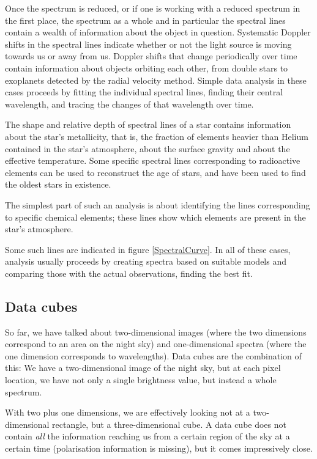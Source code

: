 \documentclass[twocolumn,apj]{openjournal}
\begin{document}
Once the spectrum is reduced, or if one is working with a reduced spectrum in the first place, the spectrum as a whole and in particular the spectral lines contain a wealth of information about the object in question. Systematic Doppler shifts in the spectral lines indicate whether or not the light source is moving towards us or away from us. Doppler shifts that change periodically over time contain information about objects orbiting each other, from double stars to exoplanets detected by the radial velocity method. Simple data analysis in these cases proceeds by fitting the individual spectral  lines, finding their central wavelength, and tracing the changes of that wavelength over time. 

The shape and relative depth of spectral lines of a star contains information about the star's metallicity, that is, the fraction of elements heavier than Helium contained in the star's atmosphere, about the surface gravity and about the effective temperature. Some specific spectral lines corresponding to radioactive elements can be used to reconstruct the age of stars, and have been used to find the oldest stars in existence. 

The simplest part of such an analysis is about identifying the lines corresponding to specific chemical elements; these lines show which elements are present in the star's atmosphere. 

Some such lines are indicated in figure \ref{SpectralCurve}. In all of these cases, analysis usually proceeds by creating spectra based on suitable models and comparing those with the actual observations, finding the best fit. 

\subsection{Data cubes}

So far, we have talked about two-dimensional images (where the two dimensions correspond to an area on the night sky) and one-dimensional spectra (where the one dimension corresponds to wavelengths). Data cubes are the combination of this: We have a two-dimensional image of the night sky, but at each pixel location, we have not only a single brightness value, but instead a whole spectrum. 

With two plus one dimensions, we are effectively looking not at a two-dimensional rectangle, but a three-dimensional cube. A data cube does not contain {\em all} the information reaching us from a certain region of the sky at a certain time (polarisation information is missing), but it comes impressively close. 
\end{document}
